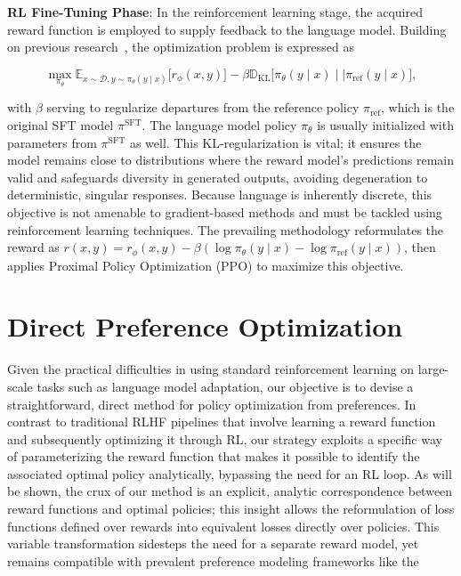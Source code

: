 \textbf{RL Fine-Tuning Phase}: In the reinforcement learning stage, the acquired reward function is employed to supply feedback to the language model. Building on previous research~\citep{jaques2017sequence, jaques2020human}, the optimization problem is expressed as

\begin{equation}\label{eq:RL}
\max_{\pi_{\theta}}  \mathbb{E}_{x\sim \mathcal{D}, y\sim \pi_{\theta}(y \mid x)}\bigl[r_{\phi}(x, y)\bigr] - \beta\mathbb{D}_{\textrm{KL}}\bigl[\pi_{\theta}(y\mid x)\mid \mid \pi_\text{ref}(y\mid x)\bigr],
\end{equation}

with $\beta$ serving to regularize departures from the reference policy $\pi_\text{ref}$, which is the original SFT model $\pi^\text{SFT}$. 
The language model policy $\pi_\theta$ is usually initialized with parameters from $\pi^\text{SFT}$ as well. This KL-regularization is vital; it ensures the model remains close to distributions where the reward model's predictions remain valid and safeguards diversity in generated outputs, avoiding degeneration to deterministic, singular responses. Because language is inherently discrete, this objective is not amenable to gradient-based methods and must be tackled using reinforcement learning techniques. The prevailing methodology \citep{ziegler2020finetuning, stiennon2022learning, bai2022training, ouyang2022training} reformulates the reward as ${r(x, y) = r_{\phi}(x, y) -\beta (\log \pi_{\theta}(y\mid x) - \log \pi_\text{ref}(y\mid x))}$, then applies Proximal Policy Optimization (PPO) \cite{schulman2017proximal} to maximize this objective.

\section{Direct Preference Optimization}\label{sec:DPO}

Given the practical difficulties in using standard reinforcement learning on large-scale tasks such as language model adaptation, our objective is to devise a straightforward, direct method for policy optimization from preferences. In contrast to traditional RLHF pipelines that involve learning a reward function and subsequently optimizing it through RL, our strategy exploits a specific way of parameterizing the reward function that makes it possible to identify the associated optimal policy analytically, bypassing the need for an RL loop. As will be shown, the crux of our method is an explicit, analytic correspondence between reward functions and optimal policies; this insight allows the reformulation of loss functions defined over rewards into equivalent losses directly over policies. This variable transformation sidesteps the need for a separate reward model, yet remains compatible with prevalent preference modeling frameworks like the

